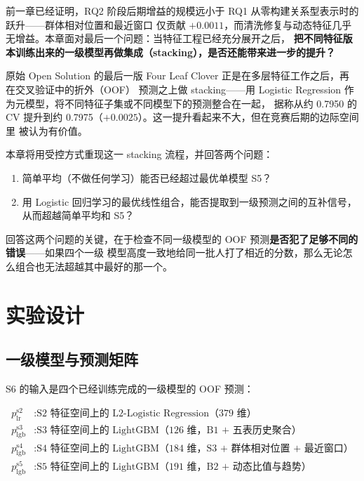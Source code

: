 \documentclass[11pt,UTF8,fontset=windows]{ctexrep}
\begin{document}
前一章已经证明，RQ2 阶段后期增益的规模远小于 RQ1 从零构建关系型表示时的跃升——群体相对位置和最近窗口
仅贡献 $+0.0011$，而清洗修复与动态特征几乎无增益。本章面对最后一个问题：当特征工程已经充分展开之后，
\textbf{把不同特征版本训练出来的一级模型再做集成（stacking），是否还能带来进一步的提升？}

原始 Open Solution 的最后一版 Four Leaf Clover 正是在多层特征工作之后，再在交叉验证中的折外（OOF）
预测之上做 stacking——用 Logistic Regression 作为元模型，将不同特征子集或不同模型下的预测整合在一起，
据称从约 0.7950 的 CV 提升到约 0.7975（$+0.0025$）。这一提升看起来不大，但在竞赛后期的边际空间里
被认为有价值。

本章将用受控方式重现这一 stacking 流程，并回答两个问题：

\begin{enumerate}
\item 简单平均（不做任何学习）能否已经超过最优单模型 S5？
\item 用 Logistic 回归学习的最优线性组合，能否提取到一级预测之间的互补信号，从而超越简单平均和 S5？
\end{enumerate}

回答这两个问题的关键，在于检查不同一级模型的 OOF 预测\textbf{是否犯了足够不同的错误}——如果四个一级
模型高度一致地给同一批人打了相近的分数，那么无论怎么组合也无法超越其中最好的那一个。

\section{实验设计}

\subsection{一级模型与预测矩阵}

S6 的输入是四个已经训练完成的一级模型的 OOF 预测：

\[
\begin{aligned}
p_{\text{lr}}^{\text{s2}} &: \text{S2 特征空间上的 L2-Logistic Regression（379 维）}\\
p_{\text{lgb}}^{\text{s3}} &: \text{S3 特征空间上的 LightGBM（126 维，B1 + 五表历史聚合）}\\
p_{\text{lgb}}^{\text{s4}} &: \text{S4 特征空间上的 LightGBM（184 维，S3 + 群体相对位置 + 最近窗口）}\\
p_{\text{lgb}}^{\text{s5}} &: \text{S5 特征空间上的 LightGBM（191 维，B2 + 动态比值与趋势）}
\end{aligned}
\]
\end{document}
